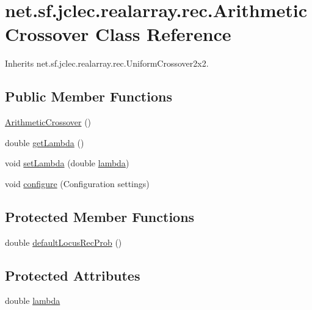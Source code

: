 \hypertarget{classnet_1_1sf_1_1jclec_1_1realarray_1_1rec_1_1_arithmetic_crossover}{\section{net.\-sf.\-jclec.\-realarray.\-rec.\-Arithmetic\-Crossover Class Reference}
\label{classnet_1_1sf_1_1jclec_1_1realarray_1_1rec_1_1_arithmetic_crossover}
}


Inherits net.\-sf.\-jclec.\-realarray.\-rec.\-Uniform\-Crossover2x2.

\subsection*{Public Member Functions}
\begin{DoxyCompactItemize}
\item 
\hyperlink{classnet_1_1sf_1_1jclec_1_1realarray_1_1rec_1_1_arithmetic_crossover_ae538fa888a52648f4a171128303f9b44}{Arithmetic\-Crossover} ()
\item 
double \hyperlink{classnet_1_1sf_1_1jclec_1_1realarray_1_1rec_1_1_arithmetic_crossover_a87e47236383dd187320787e50b151bdf}{get\-Lambda} ()
\item 
void \hyperlink{classnet_1_1sf_1_1jclec_1_1realarray_1_1rec_1_1_arithmetic_crossover_af835e6d90325c473bd4736059e328b48}{set\-Lambda} (double \hyperlink{classnet_1_1sf_1_1jclec_1_1realarray_1_1rec_1_1_arithmetic_crossover_ab29f2d1172e5106746b24cc9fa9e1c24}{lambda})
\item 
void \hyperlink{classnet_1_1sf_1_1jclec_1_1realarray_1_1rec_1_1_arithmetic_crossover_a7f0403004c9f0c01a9ce54c544a38c5d}{configure} (Configuration settings)
\end{DoxyCompactItemize}
\subsection*{Protected Member Functions}
\begin{DoxyCompactItemize}
\item 
double \hyperlink{classnet_1_1sf_1_1jclec_1_1realarray_1_1rec_1_1_arithmetic_crossover_a0d1440dac8411c5d0140e7754821ff78}{default\-Locus\-Rec\-Prob} ()
\end{DoxyCompactItemize}
\subsection*{Protected Attributes}
\begin{DoxyCompactItemize}
\item 
double \hyperlink{classnet_1_1sf_1_1jclec_1_1realarray_1_1rec_1_1_arithmetic_crossover_ab29f2d1172e5106746b24cc9fa9e1c24}{lambda}
\end{DoxyCompactItemize}


